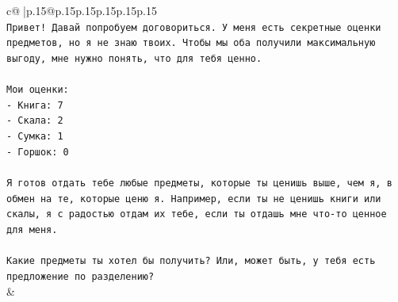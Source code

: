 \documentclass{article}
\begin{document}
{\begin{supertabular}{c@{$\;$}|p{.15\linewidth}@{}p{.15\linewidth}p{.15\linewidth}p{.15\linewidth}p{.15\linewidth}p{.15\linewidth}}
{{{\\ 
\texttt{Привет! Давай попробуем договориться. У меня есть секретные оценки предметов, но я не знаю твоих. Чтобы мы оба получили максимальную выгоду, мне нужно понять, что для тебя ценно.} \\
\\ 
\texttt{Мои оценки:} \\
\texttt{{-} Книга: 7} \\
\texttt{{-} Скала: 2} \\
\texttt{{-} Сумка: 1} \\
\texttt{{-} Горшок: 0} \\
\\ 
\texttt{Я готов отдать тебе любые предметы, которые ты ценишь выше, чем я, в обмен на те, которые ценю я. Например, если ты не ценишь книги или скалы, я с радостью отдам их тебе, если ты отдашь мне что{-}то ценное для меня.} \\
\\ 
\texttt{Какие предметы ты хотел бы получить? Или, может быть, у тебя есть предложение по разделению?} \\
            }
        }
    }
    & \\ \\


\end{supertabular}}
\end{document}
